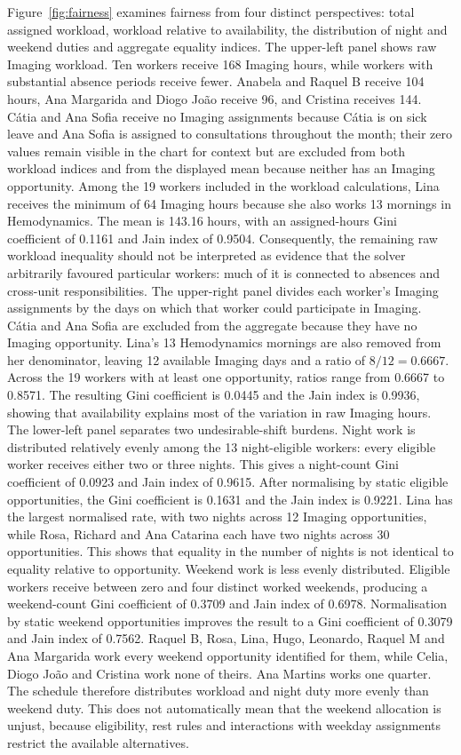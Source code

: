 \documentclass[11pt,a4paper]{article}
\begin{document}
Figure~\ref{fig:fairness} examines fairness from four distinct perspectives: total assigned workload, workload relative to availability, the distribution of night and weekend duties and aggregate equality indices.
The upper-left panel shows raw Imaging workload. Ten workers receive 168 Imaging hours, while workers with substantial absence periods receive fewer. Anabela and Raquel B receive 104 hours, Ana Margarida and Diogo João receive 96, and Cristina receives 144. C\'atia and Ana Sofia receive no Imaging assignments because C\'atia is on sick leave and Ana Sofia is assigned to consultations throughout the month; their zero values remain visible in the chart for context but are excluded from both workload indices and from the displayed mean because neither has an Imaging opportunity. Among the 19 workers included in the workload calculations, Lina receives the minimum of 64 Imaging hours because she also works 13 mornings in Hemodynamics. The mean is 143.16 hours, with an assigned-hours Gini coefficient of 0.1161 and Jain index of 0.9504. Consequently, the remaining raw workload inequality should not be interpreted as evidence that the solver arbitrarily favoured particular workers: much of it is connected to absences and cross-unit responsibilities.
The upper-right panel divides each worker's Imaging assignments by the days on which that worker could participate in Imaging. Cátia and Ana Sofia are excluded from the aggregate because they have no Imaging opportunity. Lina's 13 Hemodynamics mornings are also removed from her denominator, leaving 12 available Imaging days and a ratio of $8/12=0.6667$. Across the 19 workers with at least one opportunity, ratios range from 0.6667 to 0.8571. The resulting Gini coefficient is 0.0445 and the Jain index is 0.9936, showing that availability explains most of the variation in raw Imaging hours.
The lower-left panel separates two undesirable-shift burdens. Night work is distributed relatively evenly among the 13 night-eligible workers: every eligible worker receives either two or three nights. This gives a night-count Gini coefficient of 0.0923 and Jain index of 0.9615. After normalising by static eligible opportunities, the Gini coefficient is 0.1631 and the Jain index is 0.9221. Lina has the largest normalised rate, with two nights across 12 Imaging opportunities, while Rosa, Richard and Ana Catarina each have two nights across 30 opportunities. This shows that equality in the number of nights is not identical to equality relative to opportunity.
Weekend work is less evenly distributed. Eligible workers receive between zero and four distinct worked weekends, producing a weekend-count Gini coefficient of 0.3709 and Jain index of 0.6978. Normalisation by static weekend opportunities improves the result to a Gini coefficient of 0.3079 and Jain index of 0.7562. Raquel B, Rosa, Lina, Hugo, Leonardo, Raquel M and Ana Margarida work every weekend opportunity identified for them, while Celia, Diogo João and Cristina work none of theirs. Ana Martins works one quarter. The schedule therefore distributes workload and night duty more evenly than weekend duty. This does not automatically mean that the weekend allocation is unjust, because eligibility, rest rules and interactions with weekday assignments restrict the available alternatives.
\end{document}
